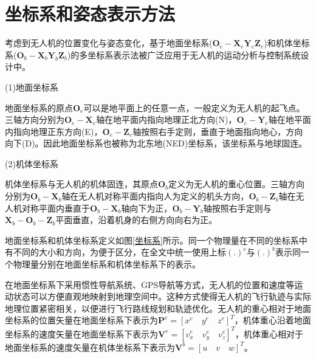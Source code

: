 \section{坐标系和姿态表示方法}

考虑到无人机的位置变化与姿态变化，基于地面坐标系($\boldsymbol{O}_e-\boldsymbol{X}_e\boldsymbol{Y}_e\boldsymbol{Z}_e $)和机体坐标系(${\boldsymbol{O}_b}-{\boldsymbol{X}_b}{\boldsymbol{Y}_b}{\boldsymbol{Z}_b}$)的多坐标系表示法被广泛应用于无人机的运动分析与控制系统设计中。

(1)地面坐标系

地面坐标系的原点$\boldsymbol{O}_e$可以是地平面上的任意一点，一般定义为无人机的起飞点。三轴方向分别为$\boldsymbol{O}_e-\boldsymbol{X}_e$轴在地平面内指向地理正北方向(N)，$\boldsymbol{O}_e-\boldsymbol{Y}_e$轴在地平面内指向地理正东方向(E)，$\boldsymbol{O}_e-\boldsymbol{Z}_e$轴按照右手定则，垂直于地面指向地心，方向向下(D)。因此地面坐标系也被称为北东地(NED)坐标系，该坐标系与地球固连。

(2)机体坐标系

机体坐标系与无人机的机体固连，其原点$\boldsymbol{O}_b$定义为无人机的重心位置。三轴方向分别为$\boldsymbol{O}_b-\boldsymbol{X}_b$轴在无人机对称平面内指向人为定义的机头方向，$\boldsymbol{O}_b-\boldsymbol{Z}_b$轴在无人机对称平面内垂直于$\boldsymbol{O}_b-\boldsymbol{X}_b$轴向下为正，$\boldsymbol{O}_b-\boldsymbol{Y}_b$轴按照右手定则与$\boldsymbol{X}_b-\boldsymbol{O}_b-\boldsymbol{Z}_b$平面垂直，沿着机身的右侧方向向右为正。

地面坐标系和机体坐标系定义如图\ref{坐标系}所示。同一个物理量在不同的坐标系中有不同的大小和方向，为便于区分，在全文中统一使用上标$(.)^{e}$与$(.)^{b}$表示同一个物理量分别在地面坐标系和机体坐标系下的表示。

在地面坐标系下采用惯性导航系统、GPS导航等方式，无人机的位置和速度等运动状态可以方便直观地映射到地理空间中。这种方式使得无人机的飞行轨迹与实际地理位置紧密相关，以便进行飞行路线规划和轨迹优化。无人机的重心相对于地面坐标系的位置矢量在地面坐标系下表示为$\boldsymbol{P}^{e}=[{x}^{e} \quad {y}^{e} \quad {z}^{e}]^{T}$，机体重心沿着地面坐标系的速度矢量在地面坐标系下表示为$\boldsymbol{V}^{e}=[{v}^{e}_{x} \quad {v}^{e}_{y} \quad {v}^{e}_{z}]^{T}$，机体重心相对于地面坐标系的速度矢量在机体坐标系下表示为$\boldsymbol{V}^{b}=[{u} \quad {v} \quad {w}]^{T}$。


